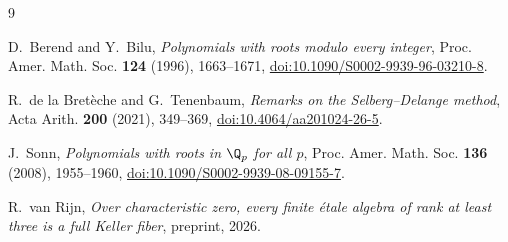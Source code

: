\begin{thebibliography}{9}
\footnotesize
\setlength{\itemsep}{0pt}

D.~Berend and Y.~Bilu,
\emph{Polynomials with roots modulo every integer},
Proc. Amer. Math. Soc. \textbf{124} (1996), 1663--1671,
\href{https://doi.org/10.1090/S0002-9939-96-03210-8}
{doi:10.1090/S0002-9939-96-03210-8}.

R.~de la Bret\`eche and G.~Tenenbaum,
\emph{Remarks on the Selberg--Delange method},
Acta Arith. \textbf{200} (2021), 349--369,
\href{https://doi.org/10.4064/aa201024-26-5}
{doi:10.4064/aa201024-26-5}.

J.~Sonn,
\emph{Polynomials with roots in \(\Q_p\) for all \(p\)},
Proc. Amer. Math. Soc. \textbf{136} (2008), 1955--1960,
\href{https://doi.org/10.1090/S0002-9939-08-09155-7}
{doi:10.1090/S0002-9939-08-09155-7}.

R.~van Rijn,
\emph{Over characteristic zero, every finite \'etale algebra of rank at
least three is a full Keller fiber},
preprint, 2026.

\end{thebibliography}
